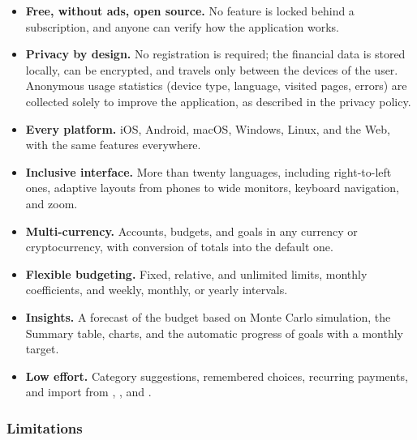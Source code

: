 \begin{itemize}
  \item \textbf{Free, without ads, open source.} No feature is locked behind a subscription,
  and anyone can verify how the application works.
  \item \textbf{Privacy by design.} No registration is required; the financial data is stored
  locally, can be encrypted, and travels only between the devices of the user. Anonymous
  usage statistics (device type, language, visited pages, errors) are collected solely to
  improve the application, as described in the privacy policy.
  \item \textbf{Every platform.} iOS, Android, macOS, Windows, Linux, and the Web, with the
  same features everywhere.
  \item \textbf{Inclusive interface.} More than twenty languages, including right-to-left
  ones, adaptive layouts from phones to wide monitors, keyboard navigation, and zoom.
  \item \textbf{Multi-currency.} Accounts, budgets, and goals in any currency or
  cryptocurrency, with conversion of totals into the default one.
  \item \textbf{Flexible budgeting.} Fixed, relative, and unlimited limits, monthly
  coefficients, and weekly, monthly, or yearly intervals.
  \item \textbf{Insights.} A forecast of the budget based on Monte Carlo simulation, the
  Summary table, charts, and the automatic progress of goals with a monthly target.
  \item \textbf{Low effort.} Category suggestions, remembered choices, recurring payments,
  and import from , , and .
\end{itemize}

\subsubsection{Limitations}

